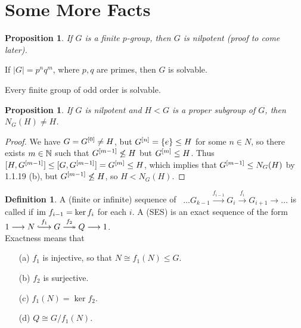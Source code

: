 \documentclass[11pt]{book}
\newcounter{counter}
\newtheorem{proposition}[counter]{Proposition}   \newtheorem{problem}[counter]{Problem}   \newtheorem*{proposition*}{Proposition}   \newtheorem*{lemma*}{Lemma}
\theoremstyle{definition}   \newtheorem{defn}[counter]{Definition} %
\newcommand{\hooklongrightarrow}{\lhook\joinrel\longrightarrow}   \newcommand{\twoheadlongrightarrow}{\relbar\joinrel\twoheadrightarrow}
\newcommand{\ses}[5]{1 \longrightarrow #1 \overset{#2}{\hooklongrightarrow} #3 \overset{#4}{\twoheadlongrightarrow} #5 \longrightarrow 1}
\DeclareMathOperator{\ra}{\rightarrow}   \DeclareMathOperator{\Poly}{\mathbf{P}}   \DeclareMathOperator{\spn}{\textnormal{span}}   \DeclareMathOperator{\aut}{\textnormal{Aut}}
\newcommand{\vs}{\vspace{8pt}}
\numberwithin{counter}{chapter}
\begin{document}
\vs

\section*{Some More Facts}

\vs

\begin{proposition*}
If $G$ is a finite $p$-group, then $G$ is nilpotent (proof to come later).
\end{proposition*}

\vs

\begin{theorem*}[Burnside]
If $|G| = p^nq^m$, where $p,q$ are primes, then $G$ is solvable.
\end{theorem*}

\vs

\begin{theorem*}
Every finite group of odd order is solvable.
\end{theorem*}

\vs

\begin{proposition}
If $G$ is nilpotent and $H < G$ is a proper subgroup of $G$, then $N_G(H) \ne H$.
\end{proposition}

\begin{proof}
We have $G = G^{[0]} \ne H$, but $G^{[n]} = \{e\} \leq H$ for some $n \in N$, so there exists $m \in \operatorname{\mathbb{N}}$ such that $G^{[m-1]} \not\leq H$ but $G^{[m]} \leq H$. Thus $[H,G^{[m-1]}] \leq [G,G^{[m-1]}] = G^{[m]} \leq H$, which implies that $G^{[m-1]} \leq N_G(H)$ by 1.1.19 (b), but $G^{[m-1]} \not\leq H$, so $H < N_G(H)$.
\end{proof}

\vs

\begin{defn}
A (finite or infinite) sequence of \hms\ $\dots G_{k-1} \overset{f_{i-1}}{\longrightarrow} G_i \overset{f_i}{\longrightarrow} G_{i+1} \ra \dots$ is called  if $\textnormal{im } f_{i-1} = \ker f_i$ for each $i$. A  (SES) is an exact sequence of the form $\ses{N}{f_1}{G}{f_2}{Q}$. \\

\noindent Exactness means that
	\begin{enumerate}
	\item[(a)] $f_1$ is injective, so that $N \cong f_1(N) \leq G$.
	\item[(b)] $f_2$ is surjective.
	\item[(c)] $f_1(N) = \ker f_2$.
	\item[(d)] $Q \cong G/f_1(N)$.
	\end{enumerate}
\end{defn}
\end{document}
